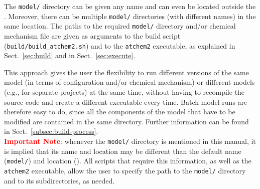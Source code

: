 The \texttt{model/} directory can be given any name and can even be
located outside the \maindir. Moreover, there can be multiple
\texttt{model/} directories (with different names) in the same
location. The paths to the required \texttt{model/} directory and/or
chemical mechanism file are given as arguments to the build script
(\texttt{build/build\_atchem2.sh}) and to the \texttt{atchem2}
executable, as explained in Sect.~\ref{sec:build} and in
Sect.~\ref{sec:execute}.

This approach gives the user the flexibility to run different versions
of the same model (in terms of configuration and/or chemical
mechanism) or different models (e.g., for separate projects) at the
same time, without having to recompile the source code and create a
different executable every time. Batch model runs are therefore easy
to do, since all the components of the model that have to be modified
are contained in the same directory. Further information can be found
in Sect.~\ref{subsec:build-process}.\\

\textcolor{red}{\bf Important Note}: whenever the \texttt{model/}
directory is mentioned in this manual, it is implied that its name and
location may be different than the default name (\texttt{model/}) and
location (\maindir). All scripts that require this information, as
well as the \texttt{atchem2} executable, allow the user to specify the
path to the \texttt{model/} directory and to its subdirectories, as
needed.
